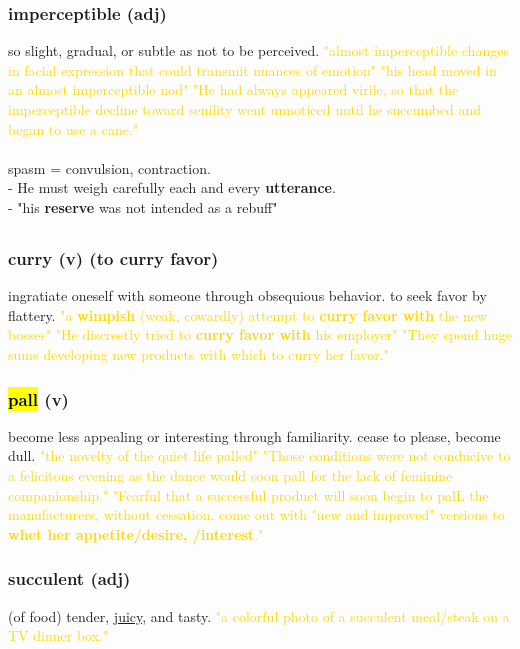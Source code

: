 \documentclass{proc}
\begin{document}
	\subsubsection{\textcolor{brickred}{imperceptible} (adj)}
	so slight, gradual, or subtle as not to be perceived.
	\textcolor{gold}{"almost imperceptible changes in facial expression that could transmit nuances of emotion" "his head moved in an almost imperceptible nod" "He had always appeared virile, so that the imperceptible decline toward senility went unnoticed until he succumbed and began to use a cane."}\\\\
	spasm = convulsion,
	contraction.\\
	- He must weigh carefully each and every \textbf{utterance}.\\
	- "his \textbf{reserve} was not intended as a rebuff"
	
	\newpage
	\setcounter{section}{41}
	\setcounter{subsection}{0}
	
	
	\subsection{}
	\subsubsection{\textcolor{brickred}{curry} (v) (to curry favor)}
	ingratiate oneself with someone through obsequious behavior. to seek favor by flattery.
	\textcolor{gold}{"a \textbf{wimpish} (weak, cowardly) attempt to \textbf{curry favor with} the new bosses" "He discreetly tried to \textbf{curry favor with} his employer" "They spend huge sums developing new products with which to curry her favor."}
	
	\subsubsection{\textcolor{brickred}{\hl{pall}} (v)}
	become less appealing or interesting through familiarity. cease to please, become dull.
	\textcolor{gold}{"the novelty of the quiet life palled" "Those conditions were not conducive to a felicitous evening as the dance would soon pall for the lack of feminine companionship." "Fearful that a successful product will soon begin to palL the manufacturers, without cessation, come out with "new and improved" versions to  \textbf{whet  her appetite/desire, /interest}."}
	
	\subsubsection{\textcolor{brickred}{succulent} (adj)}
	(of food) tender, \underline{juicy}, and tasty.
	\textcolor{gold}{ "a colorful photo of a succulent meal/steak on a TV dinner box."}
	
\end{document}
